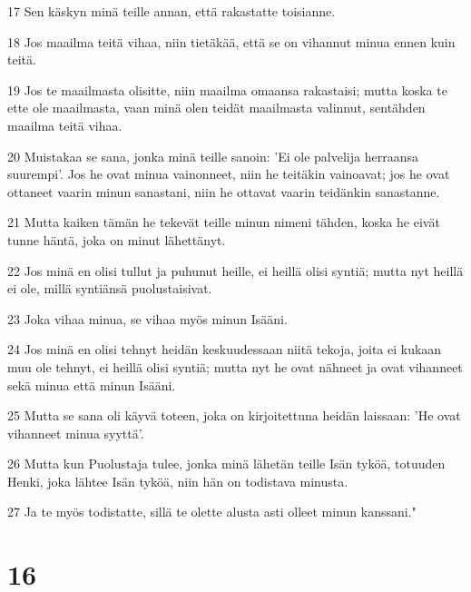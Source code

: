 \par 17 Sen käskyn minä teille annan, että rakastatte toisianne.
\par 18 Jos maailma teitä vihaa, niin tietäkää, että se on vihannut minua ennen kuin teitä.
\par 19 Jos te maailmasta olisitte, niin maailma omaansa rakastaisi; mutta koska te ette ole maailmasta, vaan minä olen teidät maailmasta valinnut, sentähden maailma teitä vihaa.
\par 20 Muistakaa se sana, jonka minä teille sanoin: 'Ei ole palvelija herraansa suurempi'. Jos he ovat minua vainonneet, niin he teitäkin vainoavat; jos he ovat ottaneet vaarin minun sanastani, niin he ottavat vaarin teidänkin sanastanne.
\par 21 Mutta kaiken tämän he tekevät teille minun nimeni tähden, koska he eivät tunne häntä, joka on minut lähettänyt.
\par 22 Jos minä en olisi tullut ja puhunut heille, ei heillä olisi syntiä; mutta nyt heillä ei ole, millä syntiänsä puolustaisivat.
\par 23 Joka vihaa minua, se vihaa myös minun Isääni.
\par 24 Jos minä en olisi tehnyt heidän keskuudessaan niitä tekoja, joita ei kukaan muu ole tehnyt, ei heillä olisi syntiä; mutta nyt he ovat nähneet ja ovat vihanneet sekä minua että minun Isääni.
\par 25 Mutta se sana oli käyvä toteen, joka on kirjoitettuna heidän laissaan: 'He ovat vihanneet minua syyttä'.
\par 26 Mutta kun Puolustaja tulee, jonka minä lähetän teille Isän tyköä, totuuden Henki, joka lähtee Isän tyköä, niin hän on todistava minusta.
\par 27 Ja te myös todistatte, sillä te olette alusta asti olleet minun kanssani."

\chapter{16}

